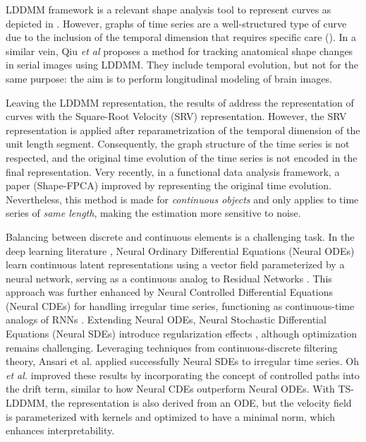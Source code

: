  LDDMM framework is a relevant shape analysis tool to represent curves as depicted in \cite{glaunes2008large}. However, graphs of time series are a well-structured type of curve due to the inclusion of the temporal dimension that requires specific care ().
 In a similar vein, Qiu \textit{et al} \cite{qiu2009time} proposes a method for tracking anatomical shape changes in serial images using LDDMM. They include temporal evolution, but not for the same purpose: the aim is to perform longitudinal modeling of brain images.

 Leaving the LDDMM representation, the results of \cite{srivastava2010shape,heo2024logistic} address the representation of curves with the Square-Root Velocity (SRV) representation.
 However, the SRV representation is applied after reparametrization of the temporal dimension of the unit length segment.
 Consequently, the graph structure of the time series is not respected, and the original time evolution of the time series is not encoded in the final representation.
 Very recently, in a functional data analysis framework, a paper \cite{wu2024shape} (Shape-FPCA) improved by representing the original time evolution.
 Nevertheless, this method is made for \textit{continuous objects} and only applies to time series of \textit{same length}, making the estimation more sensitive to noise.

 Balancing between discrete and continuous elements is a challenging task.
 In the deep learning literature \cite{chen2018neural, kidger2020neural, tzen2019neural, jia2019neural, liu2019neural, ansari2023neural}, Neural Ordinary Differential Equations (Neural ODEs) \cite{chen2018neural} learn continuous latent representations using a vector field parameterized by a neural network, serving as a continuous analog to Residual Networks \cite{zagoruyko2016wide}.
 This approach was further enhanced by Neural Controlled Differential Equations (Neural CDEs) \cite{kidger2020neural} for handling irregular time series, functioning as continuous-time analogs of RNNs \cite{schuster1997bidirectional}.
 Extending Neural ODEs, Neural Stochastic Differential Equations (Neural SDEs) introduce regularization effects \cite{liu2019neural}, although optimization remains challenging.
 Leveraging techniques from continuous-discrete filtering theory, Ansari et al. \cite{ansari2023neural} applied successfully Neural SDEs to irregular time series.
 Oh \textit{et al.} \cite{oh2024stable} improved these results by incorporating the concept of controlled paths into the drift term, similar to how Neural CDEs outperform Neural ODEs.
 With TS-LDDMM, the representation is also derived from an ODE, but the velocity field is parameterized with kernels and optimized to have a minimal norm, which enhances interpretability.

